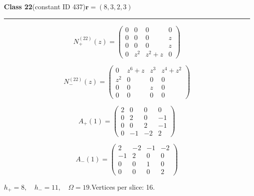 \noindent\begin{minipage}{\linewidth}
\noindent\textbf{Class 22}\quad\small (constant ID 437)\hfill $\symbf{r}=(8,3,2,3)$
\par\smallskip\noindent\textcolor{rulegray}{\rule{\linewidth}{0.3pt}}
\begin{minipage}[c]{0.495\linewidth}\centering\fontsize{9.7}{12}\selectfont
\setlength{\abovedisplayskip}{4pt}\setlength{\belowdisplayskip}{4pt}
\setlength{\abovedisplayshortskip}{4pt}\setlength{\belowdisplayshortskip}{4pt}
\setlength{\arraycolsep}{3pt}\renewcommand{\arraystretch}{1.08}
\[N_{+}^{(22)}(z)=\begin{pmatrix}0 & 0 & 0 & 0\\0 & 0 & 0 & z\\0 & 0 & 0 & z\\0 & z^{2} & z^{2} + z & 0\end{pmatrix}\]
\end{minipage}%
\begin{minipage}[c]{0.495\linewidth}\centering\fontsize{9.7}{12}\selectfont
\setlength{\abovedisplayskip}{4pt}\setlength{\belowdisplayskip}{4pt}
\setlength{\abovedisplayshortskip}{4pt}\setlength{\belowdisplayshortskip}{4pt}
\setlength{\arraycolsep}{3pt}\renewcommand{\arraystretch}{1.08}
\[N_{-}^{(22)}(z)=\begin{pmatrix}0 & z^{6} + z & z^{3} & z^{4} + z^{2}\\z^{2} & 0 & 0 & 0\\0 & 0 & z & 0\\0 & 0 & 0 & 0\end{pmatrix}\]
\end{minipage}%
\par\noindent
\begin{minipage}[c]{0.495\linewidth}\centering\fontsize{9.7}{12}\selectfont
\setlength{\abovedisplayskip}{4pt}\setlength{\belowdisplayskip}{4pt}
\setlength{\abovedisplayshortskip}{4pt}\setlength{\belowdisplayshortskip}{4pt}
\setlength{\arraycolsep}{3pt}\renewcommand{\arraystretch}{1.08}
\[A_{+}(1)=\begin{pmatrix}2 & 0 & 0 & 0\\0 & 2 & 0 & -1\\0 & 0 & 2 & -1\\0 & -1 & -2 & 2\end{pmatrix}\]
\end{minipage}%
\begin{minipage}[c]{0.495\linewidth}\centering\fontsize{9.7}{12}\selectfont
\setlength{\abovedisplayskip}{4pt}\setlength{\belowdisplayskip}{4pt}
\setlength{\abovedisplayshortskip}{4pt}\setlength{\belowdisplayshortskip}{4pt}
\setlength{\arraycolsep}{3pt}\renewcommand{\arraystretch}{1.08}
\[A_{-}(1)=\begin{pmatrix}2 & -2 & -1 & -2\\-1 & 2 & 0 & 0\\0 & 0 & 1 & 0\\0 & 0 & 0 & 2\end{pmatrix}\]
\end{minipage}%
\par\smallskip\noindent\small $h_+=8,\quad h_-=11,\quad \Omega=19.$\quad Vertices per slice: 16.
\end{minipage}\par\vfill
